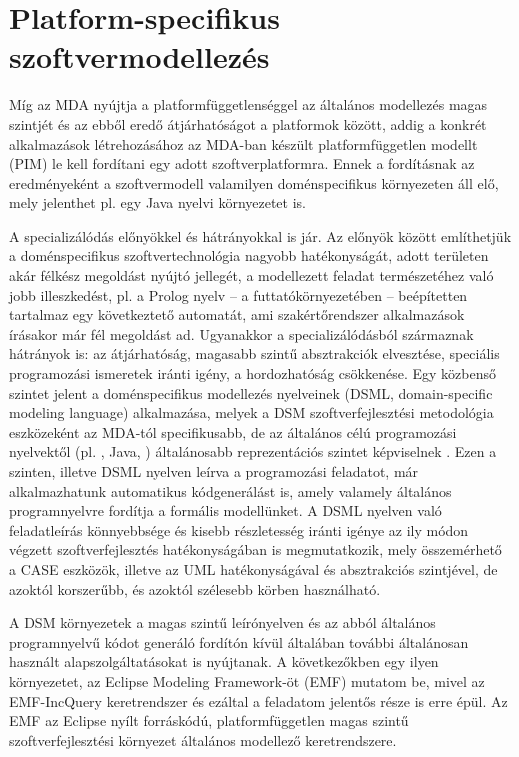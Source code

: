 
\section{Platform-specifikus szoftvermodellezés}

Míg az \gls{MDA} nyújtja a platformfüggetlenséggel az általános modellezés magas szintjét és az ebből eredő átjárhatóságot a platformok között, addig a konkrét alkalmazások létrehozásához az \gls{MDA}-ban készült platformfüggetlen modellt (\gls{PIM}) le kell fordítani egy adott szoftverplatformra.
Ennek a fordításnak az eredményeként a szoftvermodell valamilyen doménspecifikus környezeten áll elő, mely jelenthet pl. egy Java nyelvi környezetet is.

A specializálódás előnyökkel és hátrányokkal is jár.
Az előnyök között említhetjük a doménspecifikus szoftvertechnológia nagyobb hatékonyságát, adott területen akár félkész megoldást nyújtó jellegét, a modellezett feladat természetéhez való jobb illeszkedést, pl. a Prolog nyelv -- a futtatókörnyezetében -- beépítetten tartalmaz egy következtető automatát, ami szakértőrendszer alkalmazások írásakor már fél megoldást ad.
Ugyanakkor a specializálódásból származnak hátrányok is: az átjárhatóság, magasabb szintű absztrakciók elvesztése, speciális programozási ismeretek iránti igény, a hordozhatóság csökkenése.
Egy közbenső szintet jelent a doménspecifikus modellezés nyelveinek (\gls{DSML}, domain-specific modeling language) alkalmazása, melyek a \gls{DSM} szoftverfejlesztési metodológia eszközeként az \gls{MDA}-tól specifikusabb, de az általános célú programozási nyelvektől (pl. \CPP, Java, \CSharp) általánosabb reprezentációs szintet képviselnek \cite{Kelly2008}.
Ezen a szinten, illetve \gls{DSML} nyelven leírva a programozási feladatot, már alkalmazhatunk automatikus kódgenerálást is, amely valamely általános programnyelvre fordítja a formális modellünket.
A \gls{DSML} nyelven való feladatleírás könnyebbsége és kisebb részletesség iránti igénye az ily módon végzett szoftverfejlesztés hatékonyságában is megmutatkozik, mely összemérhető a \gls{CASE} eszközök, illetve az \gls{UML} hatékonyságával és absztrakciós szintjével, de azoktól korszerűbb, és azoktól szélesebb körben használható.

A \gls{DSM} környezetek a magas szintű leírónyelven és az abból általános programnyelvű kódot generáló fordítón kívül általában további általánosan használt alapszolgáltatásokat is nyújtanak.
A következőkben egy ilyen környezetet, az Eclipse Modeling Framework-öt (\gls{EMF}) mutatom be, mivel az EMF-IncQuery keretrendszer és ezáltal a feladatom jelentős része is erre épül.
Az \gls{EMF} az Eclipse nyílt forráskódú, platformfüggetlen magas szintű szoftverfejlesztési környezet általános modellező keretrendszere.

